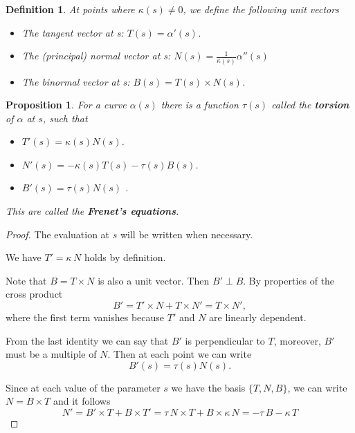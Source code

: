 \documentclass{amsart}
\newtheorem{prop}{Proposition}
\newtheorem{mydef}{Definition}
\begin{document}
\begin{mydef}
At points where \(\kappa(s) \neq 0\), we define the following unit vectors
\begin{itemize}
\item The tangent vector at s: \(T(s) = \alpha'(s)\).
\item The (principal) normal vector at s: \(N(s) = \frac{1}{\kappa(s)} \alpha''(s)\)
\item The binormal vector at s: \(B(s) = T(s) \times N(s)\).
\end{itemize}
\end{mydef}


\begin{prop}
For a curve \(\alpha(s)\) there is a function \(\tau(s)\) called the \textbf{torsion} of \(\alpha\) at \(s\), such that
\begin{itemize}
\item \(T'(s) = \kappa(s) N(s)\).
\item \(N'(s) = -\kappa(s) T(s) - \tau(s) B(s)\).
\item \(B'(s) = \tau(s) N(s)\) .
\end{itemize}

This are called the \textbf{Frenet's equations}.
\end{prop}

\begin{proof}


The evaluation at \(s\) will be written when necessary.

We have \(T' = \kappa\,N\) holds by definition.

Note that \(B = T \times N\) is also a unit vector. Then \(B' \perp B\). By properties of the cross product
\[ B' = T' \times N  + T \times N'  = T \times N',\]
where the first term vanishes because \(T'\) and \(N\) are linearly dependent.

From the last identity we can say that \(B'\) is perpendicular to \(T\), moreover, \(B'\) must be a multiple of \(N\). Then at each point we can write
\[ B'(s) = \tau(s) N(s). \]

Since at each value of the parameter \(s\) we have the basis \(\{ T, N, B\}\), we can write \(N = B \times T\) and it follows 
\[ N' = B' \times T + B \times T' = \tau\, N \times T + B \times \kappa \, N = - \tau \, B - \kappa\, T \]
\end{proof}
\end{document}
